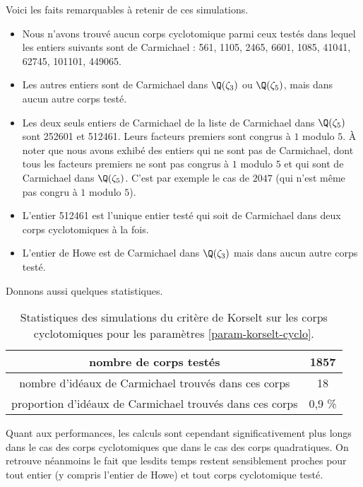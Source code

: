 Voici les faits remarquables à retenir de ces simulations.
	\begin{itemize}
		\item Nous n'avons trouvé aucun corps cyclotomique parmi ceux testés dans lequel les entiers suivants sont de Carmichael : 561, 1105, 2465, 6601, 1085, 41041, 62745, 101101, 449065.
		\item Les autres entiers sont de Carmichael dans $\Q(\zeta_3)$ ou $\Q(\zeta_5)$, mais dans aucun autre corps testé.
		\item Les deux seuls entiers de Carmichael de la liste de Carmichael dans $\Q(\zeta_5)$ sont 252601 et 512461. Leurs facteurs premiers sont congrus à $1$ modulo $5$. À noter que nous avons exhibé des entiers qui ne sont pas de Carmichael, dont tous les facteurs premiers ne sont pas congrus à $1$ modulo $5$ et qui sont de Carmichael dans $\Q(\zeta_5)$. C'est par exemple le cas de $2047$ (qui n'est même pas congru à $1$ modulo $5$). 
		\item L'entier 512461 est l'unique entier testé qui soit de Carmichael dans deux corps cyclotomiques à la fois.
		\item L'entier de Howe est de Carmichael dans $\Q(\zeta_3)$ mais dans aucun autre corps testé.
	\end{itemize}

Donnons aussi quelques statistiques.

\begin{table}[H]
	\begin{center}
		\begin{tabular}{|c|c|}
			\hline
			nombre de corps testés & 1857 \\\hline
			nombre d'idéaux de Carmichael trouvés dans ces corps & 18 \\\hline
			proportion d'idéaux de Carmichael trouvés dans ces corps & 0,9 \% \\\hline
		\end{tabular}
		\caption{Statistiques des simulations du critère de Korselt sur les corps cyclotomiques pour les paramètres \ref{param-korselt-cyclo}.}
	\end{center}
\end{table}

Quant aux performances, les calculs sont cependant significativement plus longs dans le cas des corps cyclotomiques que dans le cas des corps quadratiques. On retrouve néanmoins le fait que lesdits temps restent sensiblement proches pour tout entier (y compris l'entier de Howe) et tout corps cyclotomique testé.


